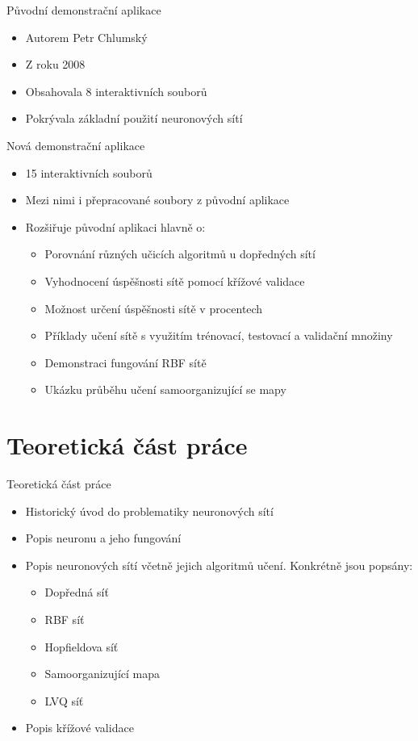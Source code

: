 \documentclass{beamer}
\begin{document}
\begin{frame}{Původní demonstrační aplikace}
\begin{itemize}
\item Autorem Petr Chlumský
\item Z roku 2008
\item Obsahovala 8 interaktivních souborů
\item Pokrývala základní použití neuronových sítí
\end{itemize}
\end{frame}
\begin{frame}{Nová demonstrační aplikace}
\begin{itemize}
\item 15 interaktivních souborů
\item Mezi nimi i přepracované soubory z původní aplikace
\item Rozšiřuje původní aplikaci hlavně o:
\begin{itemize}
\item Porovnání různých učicích algoritmů u dopředných sítí
\item Vyhodnocení úspěšnosti sítě pomocí křížové validace
\item Možnost určení úspěšnosti sítě v procentech
\item Příklady učení sítě s využitím trénovací, testovací a validační množiny
\item Demonstraci fungování RBF sítě
\item Ukázku průběhu učení samoorganizující se mapy
\end{itemize}
\end{itemize}
\end{frame}


\section{Teoretická část práce}
\begin{frame}{Teoretická část práce}
\begin{itemize}
\item Historický úvod do problematiky neuronových sítí
\item Popis neuronu a jeho fungování
\item Popis neuronových sítí včetně jejich algoritmů učení. Konkrétně jsou popsány:
\begin{itemize}
\item Dopředná síť
\item RBF síť
\item Hopfieldova síť
\item Samoorganizující mapa
\item LVQ síť
\end{itemize}
\item Popis křížové validace
\end{itemize}
\end{frame}
\end{document}
